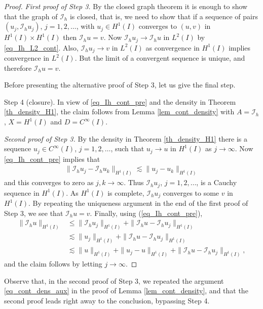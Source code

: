 \documentclass[12pt,oneside]{amsart}
\def\I{\mathcal I}
\begin{document}
\begin{proof}
{\em First proof of Step 3.}
By the closed graph theorem it is enough to show that the graph of $\I_h$ is closed, that is, we need to show that if a sequence of pairs $(u_j, \I_h u_j)$, $j=1,2,\dots$,
with $u_j \in H^1(I)$ converges to $(u, v)$ in $H^1(I) \times H^1(I)$ then $\I_h u = v$.
Now $\I_h u_j \to \I_h u$ in $L^2(I)$ by \eqref{eq_Ih_L2_cont}.
Also, $\I_h u_j \to v$ in $L^2(I)$ as convergence in $H^1(I)$ implies convergence in $L^2(I)$. But the limit of a convergent sequence is unique, and therefore $\I_h u = v$.

Before presenting the alternative proof of Step 3, let us give the final step.

Step 4 (closure).
In view of \eqref{eq_Ih_cont_pre} and the density in Theorem \ref{th_density_H1}, the claim follows from Lemma \ref{lem_cont_density}
with $A=\I_h$, $X = H^1(I)$ and $D = C^\infty(I)$.

{\em Second proof of Step 3.}
By the density in Theorem \ref{th_density_H1}
there is a sequence $u_j \in C^\infty(I)$, $j=1,2,\dots$,
such that $u_j \to u$ in $H^1(I)$ as $j \to \infty$.
Now \eqref{eq_Ih_cont_pre} implies that 
    \begin{align*}
\|\I_h u_j - \I_h u_k \|_{H^1(I)} \lesssim \|u_j - u_k\|_{H^1(I)}
    \end{align*}
and this converges to zero as $j,k \to \infty$. 
Thus $\I_h u_j$, $j=1,2,\dots$, is a Cauchy sequence in $H^1(I)$.
As $H^1(I)$ is complete, $\I_h u_j$ converges to some $v$ in $H^1(I)$.
By repeating the uniqueness argument in the end of the first proof of Step 3, we see that $\I_h u = v$.
Finally, using (\ref{eq_Ih_cont_pre}), 
    \begin{align*}
\|\I_h u\|_{H^1(I)} 
&\le 
\|\I_h u_j\|_{H^1(I)} + \|\I_h u - \I_h u_j\|_{H^1(I)} 
\\&\lesssim 
\|u_j\|_{H^1(I)} + \|\I_h u - \I_h u_j\|_{H^1(I)}
\\&\lesssim 
\|u\|_{H^1(I)} + \|u_j - u\|_{H^1(I)} + \|\I_h u - \I_h u_j\|_{H^1(I)},
    \end{align*}
and the claim follows by letting $j \to \infty$.
\end{proof}

Observe that, in the second proof of Step 3, we repeated the argument \eqref{eq_cont_dens_aux} in the proof of Lemma \ref{lem_cont_density}, and that the second proof leads right away to the conclusion, bypassing Step 4.
\end{document}
